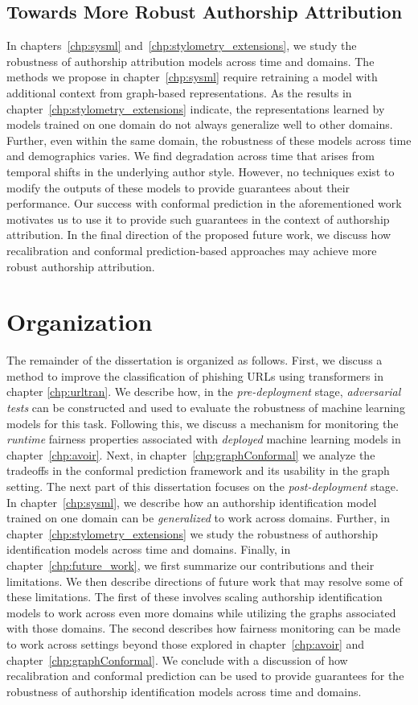 \subsection{Towards More Robust Authorship Attribution}
In chapters~\ref{chp:sysml} and~\ref{chp:stylometry_extensions}, we study the robustness of authorship attribution models across time and domains.
The methods we propose in chapter~\ref{chp:sysml} require retraining a model with additional context from graph-based representations.
As the results in chapter~\ref{chp:stylometry_extensions} indicate, the representations learned by models trained on one domain do not always generalize well to other domains.
Further, even within the same domain, the robustness of these models across time and demographics varies.
We find degradation across time that arises from temporal shifts in the underlying author style.
However, no techniques exist to modify the outputs of these models to provide guarantees about their performance.
Our success with conformal prediction in the aforementioned work motivates us to use it to provide such guarantees in the context of authorship attribution.
In the final direction of the proposed future work, we discuss how recalibration and conformal prediction-based approaches may achieve more robust authorship attribution.


\section{Organization}
The remainder of the dissertation is organized as follows. 
First, we discuss a method to improve the classification of phishing URLs using transformers in chapter \ref{chp:urltran}.
We describe how, in the \textit{pre-deployment} stage, \textit{adversarial tests} can be constructed and used to evaluate the robustness of machine learning models for this task.
Following this, we discuss a mechanism for monitoring the \textit{runtime} fairness properties associated with \textit{deployed} machine learning models in chapter~\ref{chp:avoir}.
Next, in chapter~\ref{chp:graphConformal} we analyze the tradeoffs in the conformal prediction framework and its usability in the graph setting.
The next part of this dissertation focuses on the \emph{post-deployment} stage.
In chapter~\ref{chp:sysml}, we describe how an authorship identification model trained on one domain can be \textit{generalized} to work across domains.
Further, in chapter~\ref*{chp:stylometry_extensions} we study the robustness of authorship identification models across time and domains.
Finally, in chapter~\ref{chp:future_work}, we first summarize our contributions and their limitations.
We then describe directions of future work that may resolve some of these limitations.
The first of these involves scaling authorship identification models to work across even more domains while utilizing the graphs associated with those domains.
The second describes how fairness monitoring can be made to work across settings beyond those explored in chapter~\ref{chp:avoir} and chapter~\ref{chp:graphConformal}.
We conclude with a discussion of how recalibration and conformal prediction can be used to provide guarantees for the robustness of authorship identification models across time and domains.


\endinput